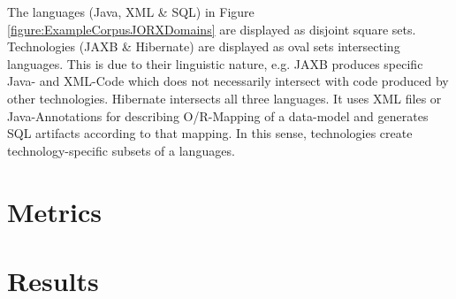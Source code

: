 The languages (\gls{Java}, \gls{XML} \& \gls{SQL}) in Figure \ref{figure:ExampleCorpusJORXDomains} are displayed as disjoint square sets.
Technologies (\gls{JAXB} \& \gls{Hibernate}) are displayed as oval sets intersecting languages.
This is due to their linguistic nature, e.g. \gls{JAXB} produces specific \Gls{Java}- and \gls{XML}-Code which does not necessarily intersect with code produced by other technologies.
\gls{Hibernate} intersects all three languages.
It uses \gls{XML} files or \gls{Java}-Annotations for describing \gls{O/R-Mapping} of a data-model and generates \gls{SQL} artifacts according to that mapping.
In this sense, technologies create technology-specific subsets of a languages.

\section{Metrics}

\section{Results}

%
